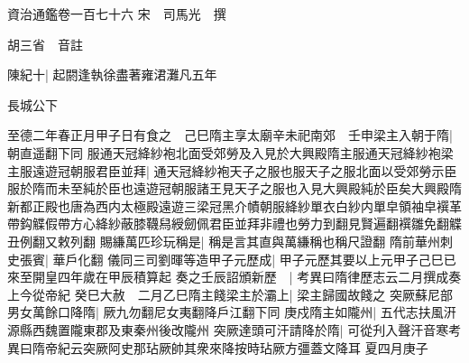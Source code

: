 資治通鑑卷一百七十六
宋　司馬光　撰

胡三省　音註

陳紀十|{
	起閼逢執徐盡著雍涒灘凡五年}


長城公下

至德二年春正月甲子日有食之　己巳隋主享太廟辛未祀南郊　壬申梁主入朝于隋|{
	朝直遥翻下同}
服通天冠絳紗袍北面受郊勞及入見於大興殿隋主服通天冠絳紗袍梁主服遠遊冠朝服君臣並拜|{
	通天冠絳紗袍天子之服也服天子之服北面以受郊勞示臣服於隋而未至純於臣也遠遊冠朝服諸王見天子之服也入見大興殿純於臣矣大興殿隋新都正殿也唐為西内太極殿遠遊三梁冠黑介幘朝服絳紗單衣白紗内單皁領袖皁襈革帶鈎䚢假帶方心絳紗蔽膝韈舄綬劒佩君臣並拜非禮也勞力到翻見賢遍翻襈雛免翻䚢丑例翻又敕列翻}
賜縑萬匹珍玩稱是|{
	稱是言其直與萬縑稱也稱尺證翻}
隋前華州刺史張賓|{
	華戶化翻}
儀同三司劉暉等造甲子元歷成|{
	甲子元歷其要以上元甲子己巳已來至開皇四年歲在甲辰積算起}
奏之壬辰詔頒新歷　|{
	考異曰隋律歷志云二月撰成奏上今從帝紀}
癸巳大赦　二月乙巳隋主餞梁主於灞上|{
	梁主歸國故餞之}
突厥蘇尼部男女萬餘口降隋|{
	厥九勿翻尼女夷翻降戶江翻下同}
庚戍隋主如隴州|{
	五代志扶風汧源縣西魏置隴東郡及東秦州後改隴州}
突厥達頭可汗請降於隋|{
	可從刋入聲汗音寒考異曰隋帝紀云突厥阿史那玷厥帥其衆來降按時玷厥方彊蓋文降耳}
夏四月庚子

